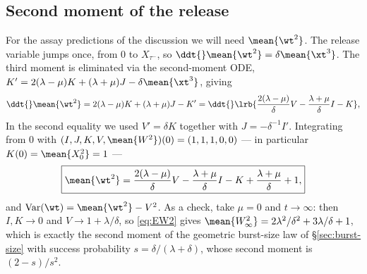 \subsection{Second moment of the release}
\label{sec:EW2-sec}

For the assay predictions of the discussion we will need $\mean{\wt^2}$.
The release variable jumps once, from $0$ to $X_{\tau^-}$, so
$\ddt{}\mean{\wt^2}=\delta\mean{\xt^3}$. The third moment is eliminated via
the second-moment ODE,
$K'=2(\lambda-\mu)K+(\lambda+\mu)J-\delta\mean{\xt^3}$, giving
\[
\ddt{}\mean{\wt^2}=2(\lambda-\mu)K+(\lambda+\mu)J-K'
=\ddt{}\lrb{\frac{2(\lambda-\mu)}{\delta}V-\frac{\lambda+\mu}{\delta}I-K},
\]
In the second equality we used $V'=\delta K$ together with
$J=-\delta^{-1}I'$. Integrating from $0$ with
$(I,J,K,V,\mean{W^2})(0)=(1,1,1,0,0)$ --- in particular $K(0)=\mean{X_0^2}=1$ ---
\begin{equation}
\boxed{\mean{\wt^2}
=\frac{2(\lambda-\mu)}{\delta}V
-\frac{\lambda+\mu}{\delta}I
-K
+\frac{\lambda+\mu}{\delta}
+1,}
\label{eq:EW2}
\end{equation}
and $\mathrm{Var}(\wt)=\mean{\wt^2}-V^2$. As a check, take $\mu=0$ and
$t\to\infty$: then $I,K\to0$ and $V\to1+\lambda/\delta$, so \eqref{eq:EW2}
gives $\mean{W_\infty^2}=2\lambda^2/\delta^2+3\lambda/\delta+1$, which is
exactly the second moment of the geometric burst-size law of
\S\ref{sec:burst-size} with success probability
$s=\delta/(\lambda+\delta)$, whose second moment is $(2-s)/s^2$.

